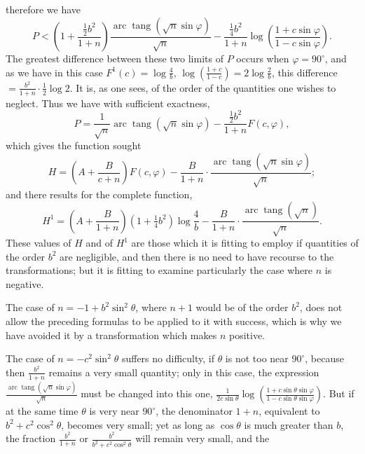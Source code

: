 \documentclass{article}
\begin{document}
therefore we have
\[ P<\left(1+\frac{\tfrac{1}{2}b^{2}}{1+n}\right)\frac{\operatorname{arc}\operatorname{tang}(\sqrt{n}\sin\varphi)}{\sqrt{n}}-\frac{\tfrac{1}{4}b^{2}}{1+n}\log\left(\frac{1+c\sin\varphi}{1-c\sin\varphi}\right). \]
The greatest difference between these two limits of $P$ occurs when $\varphi=90^{\circ}$, and as we have in this case $F^{1}(c)=\log\frac{4}{b}$, $\log\left(\frac{1+c}{1-c}\right)=2\log\frac{2}{b}$, this difference $=\frac{b^{2}}{1+n}\cdot\frac{1}{2}\log 2$. It is, as one sees, of the order of the quantities one wishes to neglect. Thus we have with sufficient exactness,
\[ P=\frac{1}{\sqrt{n}}\operatorname{arc}\operatorname{tang}(\sqrt{n}\sin\varphi)-\frac{\tfrac{1}{2}b^{2}}{1+n}F(c,\varphi), \]
which gives the function sought
\[ H=\left(A+\frac{B}{c+n}\right)F(c,\varphi)-\frac{B}{1+n}\cdot\frac{\operatorname{arc}\operatorname{tang}(\sqrt{n}\sin\varphi)}{\sqrt{n}}; \]
and there results for the complete function,
\[ H^{1}=\left(A+\frac{B}{1+n}\right)(1+\tfrac{1}{4}b^{2})\log\frac{4}{b}-\frac{B}{1+n}\cdot\frac{\operatorname{arc}\operatorname{tang}(\sqrt{n})}{\sqrt{n}}. \]
These values of $H$ and of $H^{1}$ are those which it is fitting to employ if quantities of the order $b^{2}$ are negligible, and then there is no need to have recourse to the transformations; but it is fitting to examine particularly the case where $n$ is negative.

The case of $n=-1+b^{2}\sin^{2}\theta$, where $n+1$ would be of the order $b^{2}$, does not allow the preceding formulas to be applied to it with success, which is why we have avoided it by a transformation which makes $n$ positive.

The case of $n=-c^{2}\sin^{2}\theta$ suffers no difficulty, if $\theta$ is not too near $90^{\circ}$, because then $\frac{b^{2}}{1+n}$ remains a very small quantity; only in this case, the expression $\frac{\operatorname{arc}\operatorname{tang}(\sqrt{n}\sin\varphi)}{\sqrt{n}}$ must be changed into this one, $\frac{1}{2c\sin\theta}\log\left(\frac{1+c\sin\theta\sin\varphi}{1-c\sin\theta\sin\varphi}\right)$. But if at the same time $\theta$ is very near $90^{\circ}$, the denominator $1+n$, equivalent to $b^{2}+c^{2}\cos^{2}\theta$, becomes very small; yet as long as $\cos\theta$ is much greater than $b$, the fraction $\frac{b^{2}}{1+n}$ or $\frac{b^{2}}{b^{2}+c^{2}\cos^{2}\theta}$ will remain very small, and the
\end{document}
